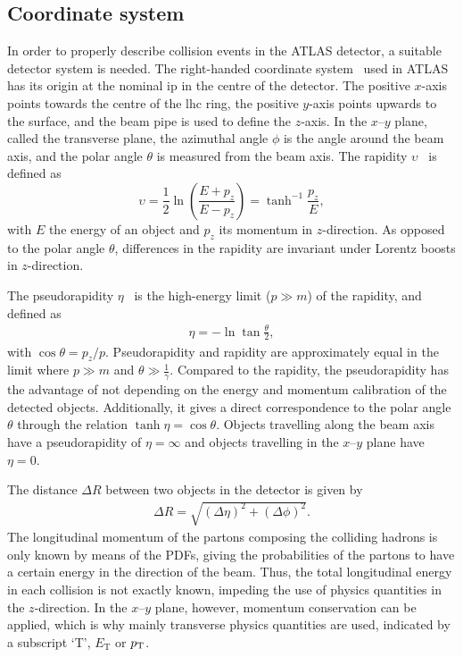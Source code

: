 \subsection{Coordinate system}

In order to properly describe collision events in the ATLAS detector, a suitable detector system is needed. The right-handed coordinate system~\cite{ATLAS:1999uwa} used in ATLAS has its origin at the nominal \gls{ip} in the centre of the detector. The positive $x$-axis points towards the centre of the \gls{lhc} ring, the positive $y$-axis points upwards to the surface, and the beam pipe is used to define the $z$-axis. In the $x$--$y$ plane, called the transverse plane, the azimuthal angle $\phi$ is the angle around the beam axis, and the polar angle $\theta$ is measured from the beam axis. The rapidity $\upsilon$~\cite{pdg2020} is defined as
\begin{equation}
	\upsilon = \frac{1}{2}\ln\left(\frac{E+p_z}{E-p_z}\right) = \tanh^{-1}{\frac{p_z}{E}},
\end{equation}
with $E$ the energy of an object and $p_z$ its momentum in $z$-direction. As opposed to the polar angle $\theta$, differences in the rapidity are invariant under Lorentz boosts in $z$-direction.

The pseudorapidity $\eta$~\cite{pdg2020} is the high-energy limit ($p\gg m$) of the rapidity, and defined as
\begin{align}
	\eta = - \ln\tan\frac{\theta}{2},
\end{align}
with $\cos\theta = p_z/p$. Pseudorapidity and rapidity are approximately equal in the limit where $p\gg m$ and $\theta \gg \frac{1}{\gamma}$. Compared to the rapidity, the pseudorapidity has the advantage of not depending on the energy and momentum calibration of the detected objects. Additionally, it gives a direct correspondence to the polar angle $\theta$ through the relation $\tanh\eta = \cos\theta$. Objects travelling along the beam axis have a pseudorapidity of $\eta = \infty$ and objects travelling in the $x$--$y$ plane have $\eta = 0$.

The distance $\Delta R$ between two objects in the detector is given by
\begin{align}
	\Delta R=\sqrt{\left(\Delta \eta\right)^2+\left(\Delta \phi\right)^2}.
\end{align}
The longitudinal momentum of the partons composing the colliding hadrons is only known by means of the \glspl{PDF}, giving the probabilities of the partons to have a certain energy in the direction of the beam. Thus, the total longitudinal energy in each collision is not exactly known, impeding the use of physics quantities in the $z$-direction. In the $x$--$y$ plane, however, momentum conservation can be applied, which is why mainly transverse physics quantities are used, indicated by a subscript `T', \eg $E_\mathrm{T}$ or $p_{\textrm{T}}$.

